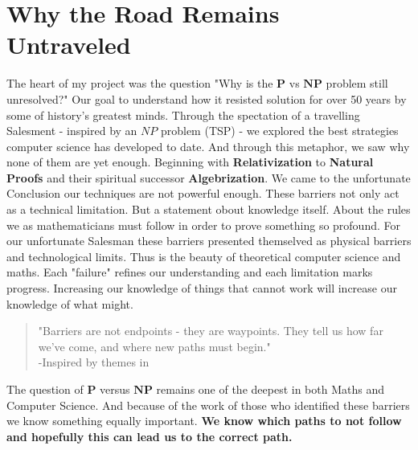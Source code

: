 \documentclass[12pt]{report}
\begin{document}
\section{Why the Road Remains Untraveled}
The heart of my project was the question "Why is the $\mathbf{P}$ vs $\mathbf{NP}$ problem still unresolved?"
Our goal to understand how it resisted solution for over 50 years by some of history's greatest minds.
Through the spectation of a travelling Salesment - inspired by an $NP$ problem (TSP) - we explored the best strategies computer science has developed to date.
And through this metaphor, we saw why none of them are yet enough.
Beginning with \textbf{Relativization} to \textbf{Natural Proofs} and their spiritual successor \textbf{Algebrization}.
We came to the unfortunate Conclusion our techniques are not powerful enough.
These barriers not only act as a technical limitation.
But a statement obout knowledge itself.
About the rules we as mathematicians must follow in order to prove something so profound.
For our unfortunate Salesman these barriers presented themselved as physical barriers and technological limits.
Thus is the beauty of theoretical computer science and maths.
Each "failure" refines our understanding and each limitation marks progress.
Increasing our knowledge of things that cannot work will increase our knowledge of what might.
\begin{quote}
    "Barriers are not endpoints - they are waypoints. They tell us how far we've come, and where new paths must begin."\\
    -Inspired by themes in \cite{arora2009}
\end{quote}
The question of $\mathbf{P}$ versus $\mathbf{NP}$ remains one of the deepest in both Maths and Computer Science.
And because of the work of those who identified these barriers we know something equally important.
\textbf{We know which paths to not follow and hopefully this can lead us to the correct path.}



\end{document}
